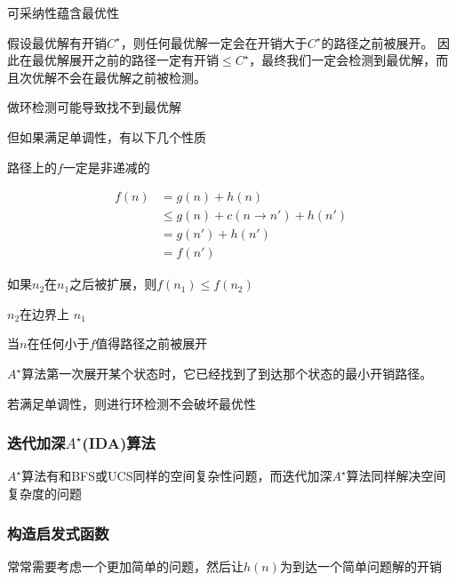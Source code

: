 \begin{theorem}
可采纳性蕴含最优性
\end{theorem}
\begin{analysis}
假设最优解有开销$C^\star$，则任何最优解一定会在开销大于$C^\star$的路径之前被展开。
因此在最优解展开之前的路径一定有开销$\leq C^\star$，最终我们一定会检测到最优解，而且次优解不会在最优解之前被检测。
\end{analysis}

做环检测可能导致找不到最优解

但如果满足单调性，有以下几个性质
\begin{proposition}
路径上的$f$一定是非递减的
\end{proposition}
\begin{analysis}
\[\begin{aligned}
f(n)&=g(n)+h(n)\\
&\leq g(n)+c(n\to n')+h(n')\\
&= g(n')+h(n')\\
&= f(n')
\end{aligned}\]
\end{analysis}

\begin{proposition}
如果$n_2$在$n_1$之后被扩展，则$f(n_1)\leq f(n_2)$
\end{proposition}
\begin{analysis}
$n_2$在边界上
$n_1$
\end{analysis}
\begin{proposition}
当$n$在任何小于$f$值得路径之前被展开
\end{proposition}
\begin{analysis}
\end{analysis}
\begin{proposition}
$A^\star$算法第一次展开某个状态时，它已经找到了到达那个状态的最小开销路径。
\end{proposition}
\begin{analysis}
\end{analysis}

若满足单调性，则进行环检测不会破坏最优性

\subsubsection{迭代加深$A^\star$(IDA)算法}
$A^\star$算法有和BFS或UCS同样的空间复杂性问题，而迭代加深$A^\star$算法同样解决空间复杂度的问题

\subsubsection{构造启发式函数}
常常需要考虑一个更加简单的问题，然后让$h(n)$为到达一个简单问题解的开销

